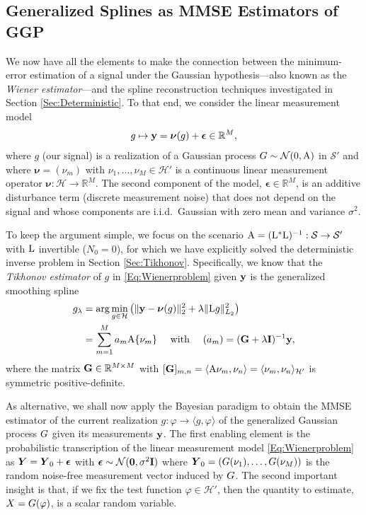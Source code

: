 \documentclass[11pt, english,english]{article}
\newcommand{\R}{ \mathbb{R}}
\newcommand{\Lop}{{\rm L}}
\def\V#1{{\boldsymbol{#1}}}         %
\def\Spc#1{{\mathcal{#1}}}  %
\def\M#1{{\bf{#1}}}  %
\def\Op#1{{\mathrm{#1}}}  %
\def\Exp{\mathop{\mathbb{E}}\nolimits}
\renewcommand{\[}{\begin{equation}}
\renewcommand{\]}[1]{\label{eq:#1}\end{equation}}
\def\Exp{\mathop{\mathbb{E}}\nolimits}
\def\Rand#1{{\uppercase{#1}}}         %
\def\VRand#1{{\uppercase{\boldsymbol #1}}}         %
\def\gRand#1{{\uppercase{ #1}}}         %
\begin{document}
\subsection{Generalized Splines as MMSE Estimators of GGP}
\label{Sec:MMSESplines}
We now have all the elements to %
make the connection between the minimum-error estimation of a signal under the Gaussian hypothesis---also known as the {\em Wiener estimator}---and the spline reconstruction techniques investigated in Section \ref{Sec:Deterministic}.
To that end, we consider the linear measurement model
\begin{align}
\label{Eq:Wienerproblem}
g \mapsto \M y=\V \nu(g) + \V \epsilon \in \R^M,
\end{align}
where $g$ (our signal) is a realization of a Gaussian process $\gRand g \sim \Spc N(0,\Op A)$ in $\Spc S'$  
 and where $\V \nu=(\nu_m)$ with $\nu_1,\dots, \nu_M\in \Spc H'$ is a continuous linear measurement operator $\V \nu: \Spc H \to \R^M$.
The second component of the model, $\V \epsilon \in \R^M$, is an additive disturbance term (discrete measurement noise) that does not depend on the signal and whose components are i.i.d.\ Gaussian with zero mean and variance %
$\sigma^2$. %

To keep the argument simple, we focus on the scenario $\Op A=(\Lop^\ast\Lop)^{-1}: \Spc S \to \Spc S'$
with $\Lop$ invertible ($N_0=0$), for which we have explicitly solved
the deterministic inverse problem in Section \ref{Sec:Tikhonov}. Specifically, we know that the {\em Tikhonov estimator} of $g$ in \eqref{Eq:Wienerproblem} given $\M y$ is the generalized smoothing spline
\begin{align}
g_\lambda&=\arg \min_{g \in \Spc H}\left( \|\M y - \V \nu(g)\|^2_2 + \lambda \|\Lop g\|^2_{L_2}\right) \nonumber\\
&=\sum_{m=1}^M a_m \Op A\{\nu_m\}\quad \mbox{ with } \quad (a_m)=(\M G + \lambda \M I)^{-1} \M y, 
\label{Eq:GSmoothingSpline}
\end{align}
where the matrix $\M G \in \R^{M \times M}$ with $[\M G]_{m,n}=\langle \Op A \nu_m, \nu_n\rangle=\langle \nu_m,\nu_n\rangle_{\Spc H'}$ is symmetric positive-definite. 

As alternative, we shall now %
apply the Bayesian paradigm to obtain the MMSE estimator of the current realization $g: \varphi \to \langle g, \varphi\rangle$ of the generalized Gaussian process $\gRand g$ given its measurements $\M y$. The first enabling element is the probabilistic transcription of the linear measurement model 
\eqref{Eq:Wienerproblem} as $\VRand Y=\VRand Y_0+ \V \epsilon$ with $\V \epsilon \sim \Spc N(\V 0, \sigma^2 \M I)$ where
$\VRand Y_0=(\gRand g(\nu_1),\dots,\gRand g(\nu_M))$ is the random noise-free measurement vector induced by $\gRand G$.
The second important insight is that, if we fix the test function $\varphi\in \Spc H'$, then the quantity to estimate,  $\Rand X=\gRand g(\varphi)$,
is a scalar random variable. 
\end{document}
